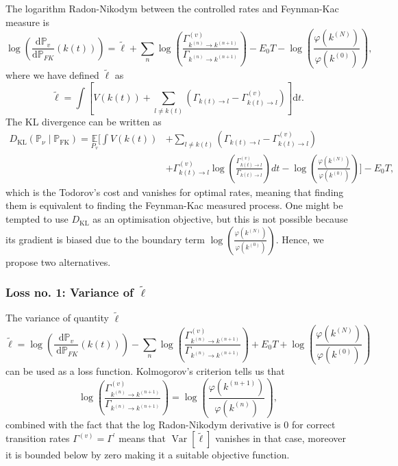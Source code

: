 The logarithm Radon-Nikodym between the controlled rates and Feynman-Kac measure is
\begin{equation}
	\label{eq:logrn-discrete}
	\log \left(\frac{\mathrm{d} \mathbb{P}_{v}}{\mathrm{d} \mathbb{P}_{F K}}(k(t))\right)
	= \tilde \ell
	+\sum_{n} \log \left(\frac{\Gamma_{k^{(n)} \rightarrow k^{(n+1)}}^{(v)}}{\Gamma_{k^{(n)} \rightarrow k^{(n+1)}}}\right)-E_{0} T-\log \left(\frac{\varphi(k^{(N)})}{\varphi(k^{(0)})}\right),
\end{equation}
where we have defined $\tilde \ell$ as
\begin{equation}
\tilde \ell = \int \left[V(k(t))+\sum_{l \neq k(t)}\left(\Gamma_{k(t) \rightarrow l}-\Gamma_{k(t) \rightarrow l}^{(v)}\right)\right] \mathrm{d}t.
\end{equation}
The KL divergence can be written as
\begin{equation}
	\begin{aligned}
		D_{\mathrm{KL}}\left(\mathbb{P}_{\nu} \mid \mathbb{P}_{\mathrm{FK}}\right) = \underset{P_{v}}{\mathbb{E}}\Bigg[\int V(k(t))&+\sum_{l \neq k(t)}\left(\Gamma_{k(t) \rightarrow l}-\Gamma_{k(t) \rightarrow l}^{(v)}\right)\\
		&+\Gamma_{k(t) \rightarrow l}^{(v)} \log \left(\frac{\Gamma_{k(t) \rightarrow l}^{(v)}}{\Gamma_{k(t) \rightarrow l}}\right) d t-\log \left(\frac{\varphi(k^{(N)})}{\varphi(k^{(0)})}\right)\Bigg]-E_{0} T,
	\end{aligned}
\end{equation}
which is the Todorov's cost and vanishes for optimal rates, meaning that finding them is equivalent to finding the Feynman-Kac measured process. One might be tempted to use $D_{\mathrm{KL}}$ as an optimisation objective, but this is not possible because its gradient is biased due to the boundary term
$\log \left(\frac{\varphi(k^{(N)})}{\varphi(k^{(0)})}\right)$. Hence, we propose two alternatives.

\subsubsection{Loss no. 1: Variance of $\tilde \ell$}
The variance of quantity $\tilde{\ell}$
\begin{equation}
	\tilde{\ell}=
	\log \left(\frac{\mathrm{d} \mathbb{P}_{v}}{\mathrm{~d} \mathbb{P}_{F K}}(k(t))\right)
	-\sum_{n} \log \left(\frac{\Gamma^{(v)}_{k^{(n)} \rightarrow k^{(n+1)}}}{\Gamma_{k^{(n)} \rightarrow k^{(n+1)}}}\right)
	+E_{0} T
	+\log \left(\frac{\varphi\left(k^{(N)}\right)}{\varphi\left(k^{(0)}\right)}\right)
\end{equation}
 can be used as a loss function. Kolmogorov's criterion tells us that
 \begin{equation}
 	\log \left(\frac{\Gamma_{k^{(n)} \rightarrow k^{(n+1)}}^{(v)}}{\Gamma_{k^{(n)} \rightarrow k^{(n+1)}}}\right)=\log \left(\frac{\varphi(k^{(n+1)})}{\varphi(k^{(n)})}\right),
 \end{equation}
 combined with the fact that the log Radon-Nikodym derivative is $0$ for correct transition rates $\Gamma^{(v)} = \Gamma^\prime$ means that $\operatorname{Var}[\tilde{\ell}]$ vanishes in that case, moreover it is bounded below by zero making it a suitable objective function. 
 
